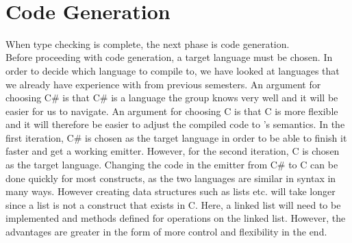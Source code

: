 
    


\\
\section{Code Generation}\label{I:CodeGeneration} \label{CodeGenLabel}
When type checking is complete, the next phase is code generation.\\
Before proceeding with code generation, a target language must be chosen. In order to decide which language to compile to, we have looked at languages that we already have experience with from previous semesters. An argument for choosing C\# is that C\# is a language the group knows very well and it will be easier for us to navigate. An argument for choosing C is that C is more flexible and it will therefore be easier to adjust the compiled code to \lang's semantics. In the first iteration, C\# is chosen as the target language in order to be able to finish it faster and get a working emitter. However, for the second iteration, C is chosen as the target language. Changing the code in the emitter from C\# to C can be done quickly for most constructs, as the two languages are similar in syntax in many ways. However creating data structures such as lists etc. will take longer since a list is not a construct that exists in C. Here, a linked list will need to be implemented and methods defined for operations on the linked list. However, the advantages are greater in the form of more control and flexibility in the end.\\

